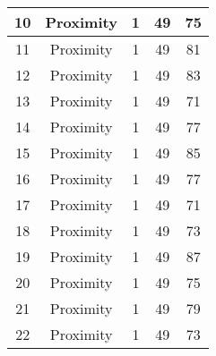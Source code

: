 \documentclass[results.tex]{subfiles}
\begin{document}
\begin{center}
\begin{tabular}{| c || c | c | c | c |}
            \hline
            10                      & Proximity                    & 1                      & 49                      & 75                   \\
            \hline
            11                      & Proximity                    & 1                      & 49                      & 81                   \\
            \hline
            12                      & Proximity                    & 1                      & 49                      & 83                   \\
            \hline
            13                      & Proximity                    & 1                      & 49                      & 71                   \\
            \hline
            14                      & Proximity                    & 1                      & 49                      & 77                   \\
            \hline
            15                      & Proximity                    & 1                      & 49                      & 85                   \\
            \hline
            16                      & Proximity                    & 1                      & 49                      & 77                   \\
            \hline
            17                      & Proximity                    & 1                      & 49                      & 71                   \\
            \hline
            18                      & Proximity                    & 1                      & 49                      & 73                   \\
            \hline
            19                      & Proximity                    & 1                      & 49                      & 87                   \\
            \hline
            20                      & Proximity                    & 1                      & 49                      & 75                   \\
            \hline
            21                      & Proximity                    & 1                      & 49                      & 79                   \\
            \hline
            22                      & Proximity                    & 1                      & 49                      & 73                   \\

\end{tabular}
\end{center}
\end{document}
